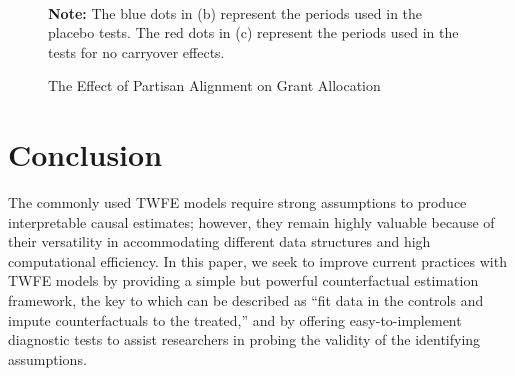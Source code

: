 \documentclass[12pt]{article}
\begin{document}
\begin{figure}[!ht]
\caption{The Effect of Partisan Alignment on Grant Allocation}\label{fg:FM2015}
\centering
\begin{minipage}{0.9\linewidth}{
\centering
{}\\
}
\footnotesize\textbf{Note:} The blue dots in (b) represent the periods used in the placebo tests. The red dots in (c) represent the periods used in the tests for no carryover effects. 
\end{minipage}
\end{figure}

\section{Conclusion}

The commonly used TWFE models require strong assumptions to produce interpretable causal estimates; however, they remain highly valuable because of their versatility in accommodating different data structures and high computational efficiency. In this paper, we seek to improve current practices with TWFE models by providing a simple but powerful counterfactual estimation framework, the key to which can be described as  ``fit data in the controls and impute counterfactuals to the treated,'' and by offering easy-to-implement diagnostic tests to assist researchers in probing the validity of the identifying assumptions. 
\end{document}
